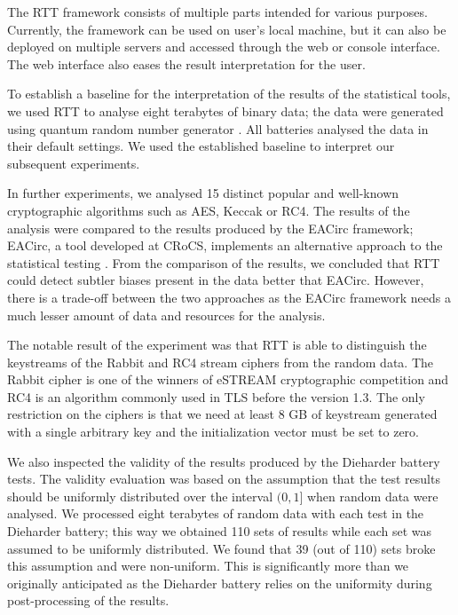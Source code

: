 \documentclass[
  digital,  	%
  color,		%
  oneside,   	%
  12pt,
  nocover,
  notable,
  nolof,
  nolot,
]{fithesis3}
\theoremstyle{definition}
\theoremstyle{remark}
\begin{document}
The RTT framework consists of multiple parts intended for various purposes. Currently, the framework can be used on user's local machine, but it can also be deployed on multiple servers and accessed through the web or console interface. The web interface also eases the result interpretation for the user.

To establish a baseline for the interpretation of the results of the statistical tools, we used RTT to analyse eight terabytes of binary data; the data were generated using quantum random number generator \cite{qrng-service-germany}. All batteries analysed the data in their default settings. We used the established baseline to interpret our subsequent experiments. 

In further experiments, we analysed 15 distinct popular and well-known cryptographic algorithms such as AES, Keccak or RC4. The results of the analysis were compared to the results produced by the EACirc framework; EACirc, a tool developed at CRoCS, implements an alternative approach to the statistical testing \cite{eacirc-github}. From the comparison of the results, we concluded that RTT could detect subtler biases present in the data better that EACirc. However, there is a trade-off between the two approaches as the EACirc framework needs a much lesser amount of data and resources for the analysis. 

The notable result of the experiment was that RTT is able to distinguish the keystreams of the Rabbit \cite{rabbit} and RC4 \cite{rc4} stream ciphers from the random data. The Rabbit cipher is one of the winners of eSTREAM \cite{estream-competition} cryptographic competition and RC4 is an algorithm commonly used in TLS before the version 1.3. The only restriction on the ciphers is that we need at least 8 GB of keystream generated with a single arbitrary key and the initialization vector must be set to zero.

We also inspected the validity of the results produced by the Dieharder battery tests. The validity evaluation was based on the assumption that the test results should be uniformly distributed over the interval $(0,1]$ when random data were analysed. We processed eight terabytes of random data with each test in the Dieharder battery; this way we obtained 110 sets of results while each set was assumed to be uniformly distributed. We found that 39 (out of 110) sets broke this assumption and were non-uniform. This is significantly more than we originally anticipated as the Dieharder battery relies on the uniformity during post-processing of the results.
\end{document}

